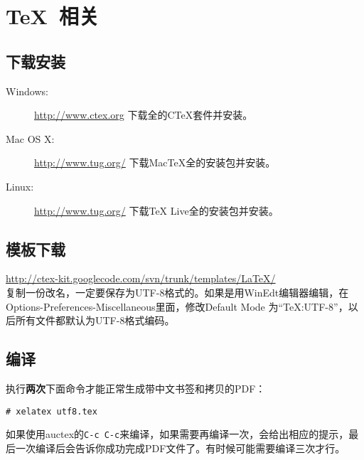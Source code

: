 \section{\TeX~相关}
\subsection{下载安装}
\begin{description}
\item[Windows:] \url{http://www.ctex.org} 下载全的CTeX套件并安装。
\item[Mac OS X:] \url{http://www.tug.org/} 下载MacTeX全的安装包并安装。
\item[Linux:] \url{http://www.tug.org/} 下载TeX Live全的安装包并安装。
\end{description}

\subsection{模板下载}
\url{http://ctex-kit.googlecode.com/svn/trunk/templates/LaTeX/}
\\
复制一份改名，一定要保存为UTF-8格式的。如果是用WinEdt编辑器编辑，在Options-\-Preferences-\-Miscellaneous里面，修改Default Mode 为``TeX:UTF-8''，以后所有文件都默认为UTF-8格式编码。
\\
\subsection{编译}
执行\textbf{两次}下面命令才能正常生成带中文书签和拷贝的PDF：
\begin{lstlisting}[numbers=none]
# xelatex utf8.tex
\end{lstlisting}

如果使用auctex的\verb|C-c C-c|来编译，如果需要再编译一次，会给出相应的提示，最后一次编译后会告诉你成功完成PDF文件了。有时候可能需要编译三次才行。


